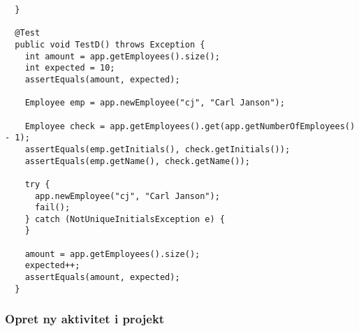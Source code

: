 \begin{lstlisting}
  }

  @Test
  public void TestD() throws Exception {
    int amount = app.getEmployees().size();
    int expected = 10;
    assertEquals(amount, expected); 

    Employee emp = app.newEmployee("cj", "Carl Janson");

    Employee check = app.getEmployees().get(app.getNumberOfEmployees() - 1);
    assertEquals(emp.getInitials(), check.getInitials()); 
    assertEquals(emp.getName(), check.getName()); 

    try {
      app.newEmployee("cj", "Carl Janson");
      fail();
    } catch (NotUniqueInitialsException e) {
    }

    amount = app.getEmployees().size();
    expected++;
    assertEquals(amount, expected); 
  }
\end{lstlisting}

\subsubsection{Opret ny aktivitet i projekt}


